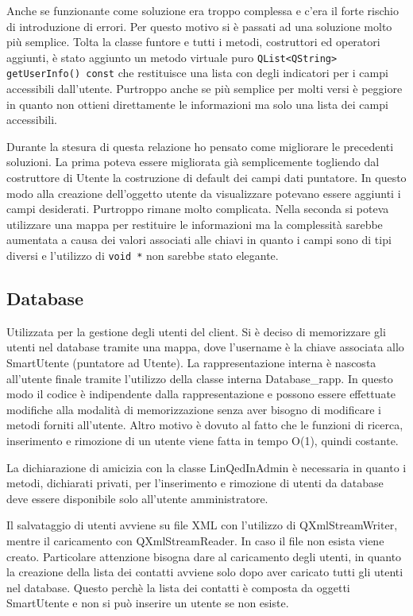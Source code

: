 \documentclass[a4paper,10pt]{article}
\begin{document}
Anche se funzionante come soluzione era troppo complessa e c'era il forte rischio di introduzione di errori. Per questo motivo si è passati ad una soluzione molto più semplice. Tolta la classe funtore e tutti i metodi, costruttori ed operatori aggiunti, è stato aggiunto un metodo virtuale puro \texttt{QList<QString> getUserInfo() const} che restituisce una lista con degli indicatori per i campi accessibili dall'utente. Purtroppo anche se più semplice per molti versi è peggiore in quanto non ottieni direttamente le informazioni ma solo una lista dei campi accessibili.

Durante la stesura di questa relazione ho pensato come migliorare le precedenti soluzioni. La prima poteva essere migliorata già semplicemente togliendo dal costruttore di Utente la costruzione di default dei campi dati puntatore. In questo modo alla creazione dell'oggetto utente da visualizzare potevano essere aggiunti i campi desiderati. Purtroppo rimane molto complicata. Nella seconda si poteva utilizzare una mappa per restituire le informazioni ma la complessità sarebbe aumentata a causa dei valori associati alle chiavi in quanto i campi sono di tipi diversi e l'utilizzo di \texttt{void *} non sarebbe stato elegante.

\subsection*{Database}
Utilizzata per la gestione degli utenti del client. Si è deciso di memorizzare gli utenti nel database tramite una mappa, dove l'username è la chiave associata allo SmartUtente (puntatore ad Utente). La rappresentazione interna è nascosta all'utente finale tramite l'utilizzo della classe interna Database\_rapp. In questo modo il codice è indipendente dalla rappresentazione e possono essere effettuate modifiche alla modalità di memorizzazione senza aver bisogno di modificare i metodi forniti all'utente. Altro motivo è dovuto al fatto che le funzioni di ricerca, inserimento e rimozione di un utente viene fatta in tempo O(1), quindi costante.

La dichiarazione di amicizia con la classe LinQedInAdmin è necessaria in quanto i metodi, dichiarati privati, per l'inserimento e rimozione di utenti da database deve essere disponibile solo all'utente amministratore.

Il salvataggio di utenti avviene su file XML con l'utilizzo di QXmlStreamWriter, mentre il caricamento con QXmlStreamReader. In caso il file non esista viene creato. Particolare attenzione bisogna dare al caricamento degli utenti, in quanto la creazione della lista dei contatti avviene solo dopo aver caricato tutti gli utenti nel database. Questo perchè la lista dei contatti è composta da oggetti SmartUtente e non si può inserire un utente se non esiste.
\end{document}

